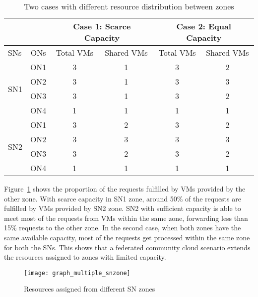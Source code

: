 \begin{table}[tbp]
    \renewcommand{\arraystretch}{1.3}
   	\footnotesize    
    \caption{Two cases with different resource distribution between zones}
    \label{tab:resource-distribution}
    \centering

    \begin{tabular}{@{} l  c  c  c  c  c @{}}
    \hline
    \multicolumn{2}{c}{} 	& \multicolumn{2}{c}{Case 1: Scarce Capacity} & \multicolumn{2}{c}{Case 2: Equal Capacity}  \\ \hline
    SNs 					&       ONs     &   Total VMs   &   Shared VMs  &   Total VMs   &   Shared VMs \\ \hline
    \multirow{4}{*}{SN1}    &       ON1     &   3     	    &	1			&    3	        &	2   \\
                            &       ON2 	&	3	        &	1			&    3	        &	3   \\
                            &       ON3 	&	3	        &	1			&    3	        &	2   \\
                            &       ON4 	&	1	        &	1			&    1	        &	1   \\
    \hline
    \multirow{4}{*}{SN2}    &       ON1     &   3     	    &	2			&    3	        &	2   \\
                            &       ON2 	&	3	        &	3			&    3	        &	3   \\
                            &       ON3 	&	3	        &	2			&    3	        &	2   \\
                            &       ON4 	&	1	        &	1			&    1	        &	1   \\
    \hline
    \end{tabular}
\end{table}     

Figure~\ref{fig:multiple-snzone-graphs} shows the proportion of the requests fulfilled by VMs provided by the other zone.
With scarce capacity in SN1 zone, around 50\% of the requests are fulfilled by VMs provided by SN2 zone.
SN2 with sufficient capacity is able to meet most of the requests from VMs within the same zone, forwarding less than 15\% requests to the other zone.
In the second case, when both zones have the same available capacity, most of the requests get processed within the same zone for both the SNs.
This shows that a federated community cloud scenario extends the resources assigned to zones with limited capacity.

\begin{figure}[tbp]
	\centering
	\texttt{[image: graph\_multiple\_snzone]}
	\caption{Resources assigned from different SN zones}
	\label{fig:multiple-snzone-graphs}
\end{figure}